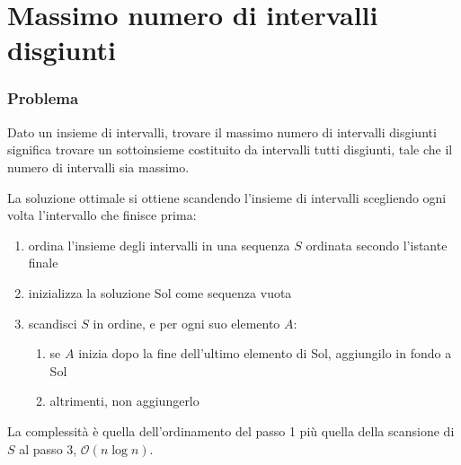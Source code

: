 \documentclass[11pt]{book}
\begin{document}
\section{Massimo numero di intervalli disgiunti}
\subsubsection{Problema}
Dato un insieme di intervalli, trovare il massimo numero di intervalli disgiunti significa trovare un sottoinsieme costituito 
da intervalli tutti disgiunti, tale che il numero di intervalli sia massimo.

La soluzione ottimale si ottiene scandendo l'insieme di intervalli scegliendo ogni volta l'intervallo che finisce prima:
\begin{enumerate}
    \item ordina l'insieme degli intervalli in una sequenza $S$ ordinata secondo l'istante finale
    \item inizializza la soluzione Sol come sequenza vuota 
    \item scandisci $S$ in ordine, e per ogni suo elemento $A$:
    \begin{enumerate}
        \item se $A$ inizia dopo la fine dell'ultimo elemento di Sol, aggiungilo in fondo a Sol 
        \item altrimenti, non aggiungerlo 
    \end{enumerate}
\end{enumerate}
La complessità è quella dell'ordinamento del passo 1 più quella della scansione di $S$ al passo 3, $\mathcal{O}(n\log n)$.
\end{document}
